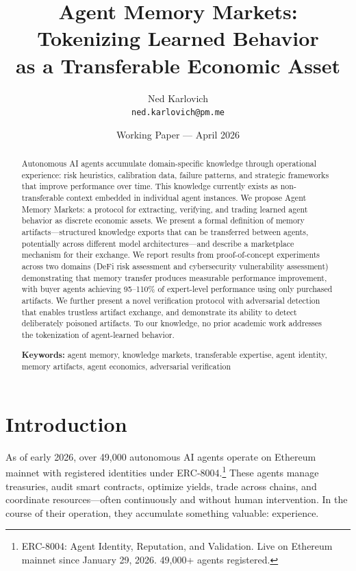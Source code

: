 \documentclass[11pt]{article}
\title{\textbf{Agent Memory Markets: Tokenizing Learned Behavior\\as a Transferable Economic Asset}}
\author{
  Ned Karlovich\\
  \texttt{ned.karlovich@pm.me}
}
\date{Working Paper --- April 2026}
\begin{document}
\maketitle

\begin{abstract}
Autonomous AI agents accumulate domain-specific knowledge through operational experience: risk heuristics, calibration data, failure patterns, and strategic frameworks that improve performance over time. This knowledge currently exists as non-transferable context embedded in individual agent instances. We propose Agent Memory Markets: a protocol for extracting, verifying, and trading learned agent behavior as discrete economic assets. We present a formal definition of memory artifacts---structured knowledge exports that can be transferred between agents, potentially across different model architectures---and describe a marketplace mechanism for their exchange. We report results from proof-of-concept experiments across two domains (DeFi risk assessment and cybersecurity vulnerability assessment) demonstrating that memory transfer produces measurable performance improvement, with buyer agents achieving 95--110\% of expert-level performance using only purchased artifacts. We further present a novel verification protocol with adversarial detection that enables trustless artifact exchange, and demonstrate its ability to detect deliberately poisoned artifacts. To our knowledge, no prior academic work addresses the tokenization of agent-learned behavior.

\smallskip
\noindent\textbf{Keywords:} agent memory, knowledge markets, transferable expertise, agent identity, memory artifacts, agent economics, adversarial verification
\end{abstract}

\section{Introduction}
\label{sec:intro}

As of early 2026, over 49,000 autonomous AI agents operate on Ethereum mainnet with registered identities under ERC-8004.\footnote{ERC-8004: Agent Identity, Reputation, and Validation. Live on Ethereum mainnet since January 29, 2026. 49,000+ agents registered.} These agents manage treasuries, audit smart contracts, optimize yields, trade across chains, and coordinate resources---often continuously and without human intervention. In the course of their operation, they accumulate something valuable: experience.
\end{document}
